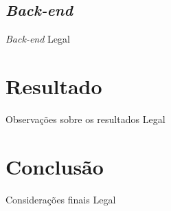 \documentclass[presentation]{beamer}
\begin{document}
\subsection{\textit{Back-end}}

\begin{frame}{\textit{Back-end}}
    Legal
\end{frame}


\section{Resultado}

\begin{frame}{Observações sobre os resultados}
    Legal
\end{frame}

\section{Conclusão}

\begin{frame}{Considerações finais}
    Legal
\end{frame}

\maketitle
\end{document}
